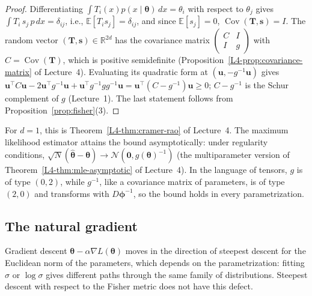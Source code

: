 \documentclass[11pt]{article}
\newcommand{\E}{\mathbb{E}}
\theoremstyle{definition}
\theoremstyle{plain}
\theoremstyle{remark}
\DeclareMathOperator{\Cov}{Cov}
\begin{document}
\begin{proof}
    Differentiating $\int T_i(x)p(x \mid \boldsymbol{\theta})\, dx = \theta_i$ with respect to $\theta_j$ gives $\int T_i\,s_j\,p\, dx = \delta_{ij}$, i.e., $\E[T_is_j] = \delta_{ij}$, and since $\E[s_j] = 0$, $\Cov(\mathbf{T}, \mathbf{s}) = I$. The random vector $(\mathbf{T}, \mathbf{s}) \in \mathbb{R}^{2d}$ has the covariance matrix $\begin{pmatrix} C & I \\ I & g \end{pmatrix}$ with $C = \Cov(\mathbf{T})$, which is positive semidefinite (Proposition~\ref{L4-prop:covariance-matrix} of Lecture~4). Evaluating its quadratic form at $(\mathbf{u}, -g^{-1}\mathbf{u})$ gives $\mathbf{u}^\top C\mathbf{u} - 2\mathbf{u}^\top g^{-1}\mathbf{u} + \mathbf{u}^\top g^{-1}gg^{-1}\mathbf{u} = \mathbf{u}^\top(C - g^{-1})\mathbf{u} \geq 0$; $C - g^{-1}$ is the Schur complement of $g$ (Lecture~1). The last statement follows from Proposition~\ref{prop:fisher}(3).
\end{proof}

For $d = 1$, this is Theorem~\ref{L4-thm:cramer-rao} of Lecture~4. The maximum likelihood estimator attains the bound asymptotically: under regularity conditions, $\sqrt{N}(\hat{\boldsymbol{\theta}} - \boldsymbol{\theta}) \to \mathcal{N}(\mathbf{0}, g(\boldsymbol{\theta})^{-1})$ (the multiparameter version of Theorem~\ref{L4-thm:mle-asymptotic} of Lecture~4). In the language of tensors, $g$ is of type $(0, 2)$, while $g^{-1}$, like a covariance matrix of parameters, is of type $(2, 0)$ and transforms with $D\boldsymbol{\phi}^{-1}$, so the bound holds in every parametrization.

\subsection{The natural gradient}

Gradient descent $\boldsymbol{\theta} - \alpha\nabla L(\boldsymbol{\theta})$ moves in the direction of steepest descent for the Euclidean norm of the parameters, which depends on the parametrization: fitting $\sigma$ or $\log\sigma$ gives different paths through the same family of distributions. Steepest descent with respect to the Fisher metric does not have this defect.
\end{document}
